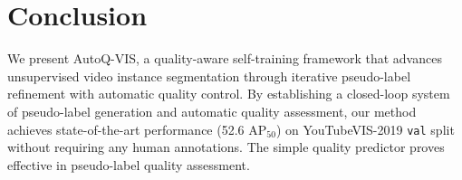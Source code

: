 \section{Conclusion}

We present AutoQ-VIS, a quality-aware self-training framework that advances unsupervised video instance segmentation through iterative pseudo-label refinement with automatic quality control. By establishing a closed-loop system of pseudo-label generation and automatic quality assessment, our method achieves state-of-the-art performance (52.6 $\text{AP}_{50}$) on YouTubeVIS-2019 \texttt{val} split without requiring any human annotations. The simple quality predictor proves effective in pseudo-label quality assessment. 





